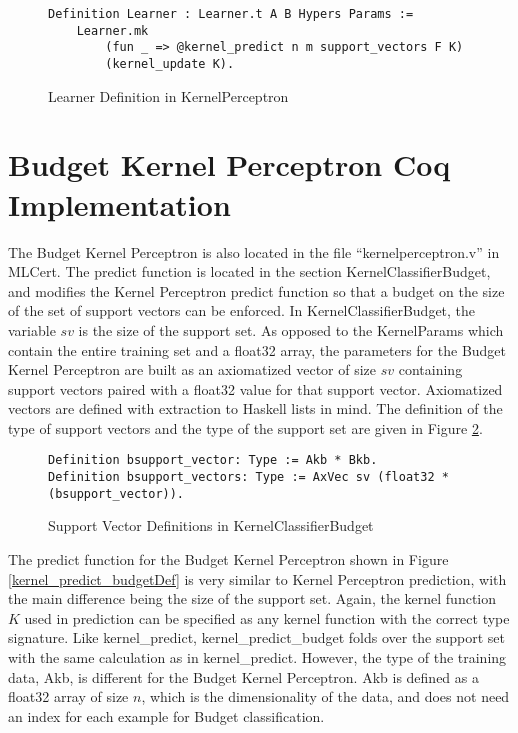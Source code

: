 \begin{figure}
    \caption{Learner Definition in KernelPerceptron}
    \label{kpLearnerDef}
    \begin{lstlisting}
Definition Learner : Learner.t A B Hypers Params :=
    Learner.mk
        (fun _ => @kernel_predict n m support_vectors F K)
        (kernel_update K).
    \end{lstlisting}
\end{figure}

\section{Budget Kernel Perceptron Coq Implementation}\label{KPBCoqImp}
The Budget Kernel Perceptron is also located in the file ``kernelperceptron.v'' in MLCert. The predict function is located in the section KernelClassifierBudget, and modifies the Kernel Perceptron predict function so that a budget on the size of the set of support vectors can be enforced. In KernelClassifierBudget, the variable $sv$ is the size of the support set. As opposed to the KernelParams which contain the entire training set and a float32 array, the parameters for the Budget Kernel Perceptron are built as an axiomatized vector of size $sv$ containing support vectors paired with a float32 value for that support vector. Axiomatized vectors are defined with extraction to Haskell lists in mind. The definition of the type of support vectors and the type of the support set are given in Figure \ref{KPBsupportDef}. 

\begin{figure}
    \caption{Support Vector Definitions in KernelClassifierBudget}
    \label{KPBsupportDef}
    \begin{lstlisting}
Definition bsupport_vector: Type := Akb * Bkb.
Definition bsupport_vectors: Type := AxVec sv (float32 * (bsupport_vector)).
    \end{lstlisting}
\end{figure}

The predict function for the Budget Kernel Perceptron shown in Figure \ref{kernel_predict_budgetDef} is very similar to Kernel Perceptron prediction, with the main difference being the size of the support set. Again, the kernel function $K$ used in prediction can be specified as any kernel function with the correct type signature. Like kernel\_predict, kernel\_predict\_budget folds over the support set with the same calculation as in kernel\_predict. However, the type of the training data, Akb, is different for the Budget Kernel Perceptron. Akb is defined as a float32 array of size $n$, which is the dimensionality of the data, and does not need an index for each example for Budget classification.


